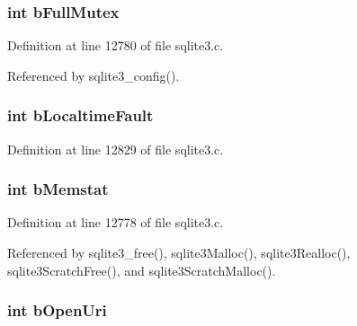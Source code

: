 \subsubsection[{b\+Full\+Mutex}]{\setlength{\rightskip}{0pt plus 5cm}int b\+Full\+Mutex}\label{struct_sqlite3_config_a13bc99b79aa8349932f788be7415077c}


Definition at line 12780 of file sqlite3.\+c.



Referenced by sqlite3\+\_\+config().

\hypertarget{struct_sqlite3_config_a148fb0a51b89a6ecacc43a61b445cbe1}{}
\subsubsection[{b\+Localtime\+Fault}]{\setlength{\rightskip}{0pt plus 5cm}int b\+Localtime\+Fault}\label{struct_sqlite3_config_a148fb0a51b89a6ecacc43a61b445cbe1}


Definition at line 12829 of file sqlite3.\+c.

\hypertarget{struct_sqlite3_config_a8dfc655e09e968f581673d82fce0769a}{}
\subsubsection[{b\+Memstat}]{\setlength{\rightskip}{0pt plus 5cm}int b\+Memstat}\label{struct_sqlite3_config_a8dfc655e09e968f581673d82fce0769a}


Definition at line 12778 of file sqlite3.\+c.



Referenced by sqlite3\+\_\+free(), sqlite3\+Malloc(), sqlite3\+Realloc(), sqlite3\+Scratch\+Free(), and sqlite3\+Scratch\+Malloc().

\hypertarget{struct_sqlite3_config_ad7b7a342d22db7302e7c2891d9ada29c}{}
\subsubsection[{b\+Open\+Uri}]{\setlength{\rightskip}{0pt plus 5cm}int b\+Open\+Uri}\label{struct_sqlite3_config_ad7b7a342d22db7302e7c2891d9ada29c}


